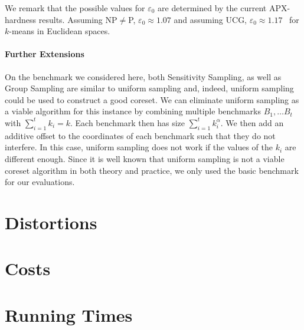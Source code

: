 We remark that the possible values for $\varepsilon_0$ are determined by the current APX-hardness results. Assuming NP$\neq$P, $\varepsilon_0\approx 1.07$ and assuming UCG, $\varepsilon_0 \approx 1.17$~\cite{Cohen-AddadSL21,Cohen-AddadS19} for $k$-means in Euclidean spaces.



\paragraph*{Further Extensions}

On the benchmark we considered here, both Sensitivity Sampling, as well as Group Sampling are similar to uniform sampling and, indeed, uniform sampling could be used to construct a good coreset. We can eliminate uniform sampling as a viable algorithm for this instance by combining multiple benchmarks $B_1,\ldots B_t$ with $\sum_{i=1}^t  k_i =k$. Each benchmark then has size $\sum_{i=1}^t  k_i^{\alpha}$. We then add an additive offset to the coordinates of each benchmark such that they do not interfere. In this case, uniform sampling does not work if the values of the $k_i$ are different enough. Since it is well known that uniform sampling is not a viable coreset algorithm in both theory and practice, we only used the basic benchmark for our evaluations.






\section{Distortions}
\label{sec:distortions-tables}







\section{Costs}
\label{sec:costs-tables}





\section{Running Times}
\label{sec:running-times-tables}





